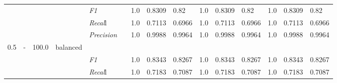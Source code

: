 \begin{table}[]
\begin{tabularx}{\textwidth}{XXlllllllllllll@{}}
                                                                    &                                                                     &                                                           &    & \textit{F1} &                                                      & 1.0        & 0.8309        & 0.82        & 1.0        & 0.8309        & 0.82        & 1.0        & 0.8309        & 0.82        \\
                                                                    &                                                                     &                                                           &    & \textit{Recal}l &                                                      & 1.0    & 0.7113    & 0.6966    & 1.0    & 0.7113    & 0.6966    & 1.0    & 0.7113    & 0.6966    \\
                                                                    &                                                                     &                                                           &    & \textit{Precision} &                                                      & 1.0 & 0.9988 & 0.9964 & 1.0 & 0.9988 & 0.9964 & 1.0 & 0.9988 & 0.9964 \\ \midrule
0.5 & - & 100.0 & balanced &                                                              &                                                                   &                                                             &                                                               &                                                                    &                                                              &                                                               &                                                                    &                                                              \\
                                                                    &                                                                     &                                                           &    & \textit{F1} &                                                      & 1.0        & 0.8343        & 0.8267        & 1.0        & 0.8343        & 0.8267        & 1.0        & 0.8343        & 0.8267        \\
                                                                    &                                                                     &                                                           &    & \textit{Recal}l &                                                      & 1.0    & 0.7183    & 0.7087    & 1.0    & 0.7183    & 0.7087    & 1.0    & 0.7183    & 0.7087    \\

\end{tabularx}
\end{table}

